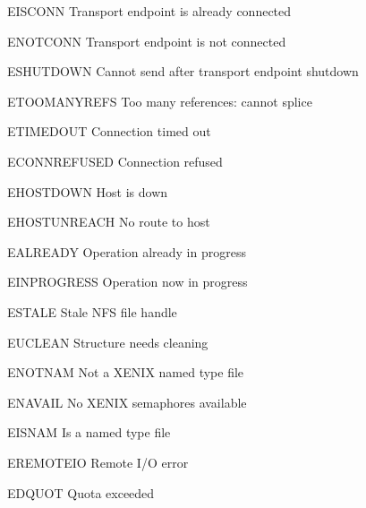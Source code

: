 \begin{datadesc}{EISCONN} Transport endpoint is already connected \end{datadesc}
\begin{datadesc}{ENOTCONN} Transport endpoint is not connected \end{datadesc}
\begin{datadesc}{ESHUTDOWN} Cannot send after transport endpoint shutdown \end{datadesc}
\begin{datadesc}{ETOOMANYREFS} Too many references: cannot splice \end{datadesc}
\begin{datadesc}{ETIMEDOUT} Connection timed out \end{datadesc}
\begin{datadesc}{ECONNREFUSED} Connection refused \end{datadesc}
\begin{datadesc}{EHOSTDOWN} Host is down \end{datadesc}
\begin{datadesc}{EHOSTUNREACH} No route to host \end{datadesc}
\begin{datadesc}{EALREADY} Operation already in progress \end{datadesc}
\begin{datadesc}{EINPROGRESS} Operation now in progress \end{datadesc}
\begin{datadesc}{ESTALE} Stale NFS file handle \end{datadesc}
\begin{datadesc}{EUCLEAN} Structure needs cleaning \end{datadesc}
\begin{datadesc}{ENOTNAM} Not a XENIX named type file \end{datadesc}
\begin{datadesc}{ENAVAIL} No XENIX semaphores available \end{datadesc}
\begin{datadesc}{EISNAM} Is a named type file \end{datadesc}
\begin{datadesc}{EREMOTEIO} Remote I/O error \end{datadesc}
\begin{datadesc}{EDQUOT} Quota exceeded \end{datadesc}

